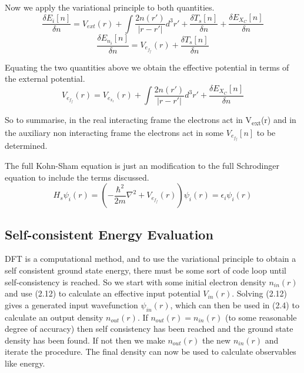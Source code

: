 \documentclass[12pt]{article}
\begin{document}
Now we apply the variational principle to both quantities. 
\begin{equation} \label{2.10} \tag{2.10}
\frac{\delta E_i[n]}{\delta n} = V_{ext}(r) + \int \frac{2n(r')}{|r-r'|}d^3r'  +\frac{\delta T_s[n]}{\delta n} + \frac{\delta E_X_C[n]}{\delta n}
\end{equation}
\begin{equation} \label{2.11} \tag{2.11}
\frac{\delta E_n_i[n]}{\delta n}= V_e_f_f(r) + \frac{\delta T_s[n]}{\delta n}
\end{equation}

Equating the two quantities above we obtain the effective potential in terms of the external potential.
\begin{equation} \label{2.12} \tag{2.12}
V_e_f_f(r)=V_e_x_t(r)  +\int \frac{2n(r')}{|r-r'|}d^3r' + \frac{\delta E_X_C[n]}{\delta n}
\end{equation}

So to summarise, in the real interacting frame the electrons act in  V\textsubscript{ext}(r) and in the auxiliary non interacting frame the electrons act in some $V_e_f_f[n]$ to be determined.

The full Kohn-Sham equation is just an modification to the full Schrodinger equation to include the terms discussed.
\begin{equation} \label{2.12} \tag{2.13}
H_s \psi_i (r) = (-\frac{\hbar^2}{2m}\nabla^2 +V_e_f_f(r) ) \psi_i (r) = \epsilon_i \psi_i (r)
\end{equation}

\subsection{Self-consistent Energy Evaluation}

DFT is a computational method, and to use the variational principle to obtain a self consistent ground state energy, there must be some sort of code loop until self-consistency is reached. So we start with some initial electron density $n_{in}(r)$ and use (2.12) to calculate an effective input potential $V_{in}(r)$. Solving (2.12) gives a generated input wavefunction $\psi_{in}(r)$, which can then be used in (2.4) to calculate an output density $n_{out}(r)$. If $n_{out}(r)=n_{in}(r)$ (to some reasonable degree of accuracy) then self consistency has been reached and the ground state density has been found. If not then we make $n_{out}(r)$ the new $n_{in}(r)$ and iterate the procedure. The final density can now be used to calculate observables like energy.
\end{document}
